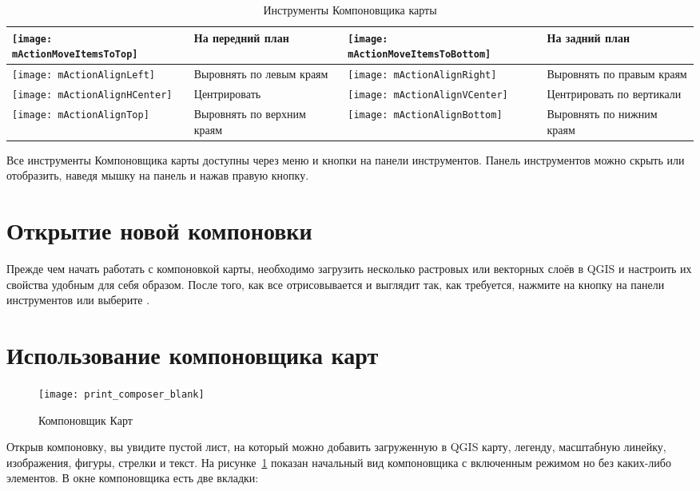 \begin{table}[h]
\begin{tabular}{|m{1cm}|m{5.4cm}|m{1cm}|m{5.4cm}|}
 \hline \texttt{[image: mActionMoveItemsToTop]} & На передний
 план &
 \texttt{[image: mActionMoveItemsToBottom]} & На задний
 план \\
 \hline \texttt{[image: mActionAlignLeft]} & Выровнять по
 левым краям &
 \texttt{[image: mActionAlignRight]} & Выровнять по правым
 краям \\
 \hline \texttt{[image: mActionAlignHCenter]} & Центрировать &
 \texttt{[image: mActionAlignVCenter]} & Центрировать по
 вертикали \\
 \hline \texttt{[image: mActionAlignTop]} & Выровнять по верхним
 краям &
 \texttt{[image: mActionAlignBottom]} & Выровнять по нижним
 краям \\
\hline
\end{tabular}
\caption{Инструменты Компоновщика карты}\label{tab:printcomposer_tools}
\end{table}

Все инструменты Компоновщика карты доступны через меню и кнопки на
панели инструментов. Панель инструментов можно скрыть или отобразить,
наведя мышку на панель и нажав правую кнопку.

\section{Открытие новой компоновки}\label{composertemplates}

Прежде чем начать работать с компоновкой карты, необходимо загрузить
несколько растровых или векторных слоёв в QGIS и настроить их свойства
удобным для себя образом. После того, как все отрисовывается и выглядит
так, как требуется, нажмите на кнопку
 на панели
инструментов или выберите  \arrow
{}.

\section{Использование компоновщика карт}\label{label_useprintcomposer}

\begin{figure}[ht]
   \centering
   \texttt{[image: print\_composer\_blank]}
   \caption{Компоновщик Карт \wincaption}\label{fig:print_composer_blank}
\end{figure}

Открыв компоновку, вы увидите пустой лист, на который можно добавить
загруженную в QGIS карту, легенду, масштабную линейку, изображения,
фигуры, стрелки и текст. На рисунке~\ref{fig:print_composer_blank}
показан начальный вид компоновщика с включенным режимом
 но без каких-либо элементов. В окне
компоновщика есть две вкладки:

